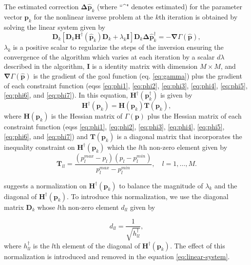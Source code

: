 The estimated correction $\boldsymbol{\Delta}\hat{\mathbf{p}}_k$ (where ``\^{}" denotes estimated) for the parameter vector $\mathbf{p}_k$ for the nonlinear inverse problem at the $k$th iteration is obtained by solving the linear system given by
\begin{equation}\label{eq:linear-system}
\mathbf{D}_k\left[\mathbf{D}_k\mathbf{H}^\dagger(\hat{\mathbf{p}}_k)\mathbf{D}_k + \lambda_k\mathbf{I}\right]\mathbf{D}_k\boldsymbol{\Delta}\hat{\mathbf{p}}^\dagger_k = -\boldsymbol{\nabla}\Gamma(\hat{\mathbf{p}}),
\end{equation}
$\lambda_k$ is a positive scalar to regularize the steps of the inversion ensuring the convergence of the algorithm which varies at each iteration by a scalar $d\lambda$ described in the algorithm, $\mathbf{I}$ is a identity matrix with dimension $M\times M$, and $\boldsymbol{\nabla}\Gamma(\hat{\mathbf{p}})$ is the gradient of the goal function (eq. \ref{eq:gamma}) plus the gradient of each constraint function (eqss \ref{eq:phi1}, \ref{eq:phi2}, \ref{eq:phi3}, \ref{eq:phi4}, \ref{eq:phi5}, \ref{eq:phi6}, and \ref{eq:phi7}). In this equation, $\mathbf{H}^\dagger(\mathbf{p}^\dagger_k)$ is given by
\begin{equation}\label{eq:H-dagger}
\mathbf{H}^\dagger(\mathbf{p}_k) = \mathbf{H}(\mathbf{p}_k)\mathbf{T}(\mathbf{p}_k),
\end{equation}
where $\mathbf{H}(\mathbf{p}_k)$ is the Hessian matrix of $\Gamma(\mathbf{p})$ plus the Hessian matrix of each constraint function (eqss \ref{eq:phi1}, \ref{eq:phi2}, \ref{eq:phi3}, \ref{eq:phi4}, \ref{eq:phi5}, \ref{eq:phi6}, and \ref{eq:phi7}) and $\mathbf{T}(\mathbf{p}_k)$ is a diagonal matrix that incorporates the inequality constraint on $\mathbf{H}^\dagger(\mathbf{p}_k)$ which the $l$th non-zero element given by
\begin{equation}\label{eq:inequality-diag}
\mathbf{T}_{ll} = \frac{(p_l^{max} - p_l)(p_l - p_l^{min})}{p_l^{max} - p_l^{min}}, \quad l = 1, \dots, M .
\end{equation}

\cite{marquardt_algorithm_1963} suggests a normalization on $\mathbf{H}^\dagger(\mathbf{p}_k)$ to balance the magnitude of $\lambda_k$ and the diagonal of $\mathbf{H}^\dagger(\mathbf{p}_k)$. To introduce this normalization, we use the diagonal matrix $\mathbf{D}_k$ whose $l$th non-zero element $d_{ll}$ given by

\begin{equation}\label{eq:D-matrix}
d_{ll} = \frac{1}{\sqrt{h^\dagger_{ll}}},
\end{equation}
where $h^\dagger_{ll}$ is the $l$th element of the diagonal of $\mathbf{H}^\dagger(\mathbf{p}_k)$. The effect of this normalization is introduced and removed in the equation \ref{eq:linear-system}. 


